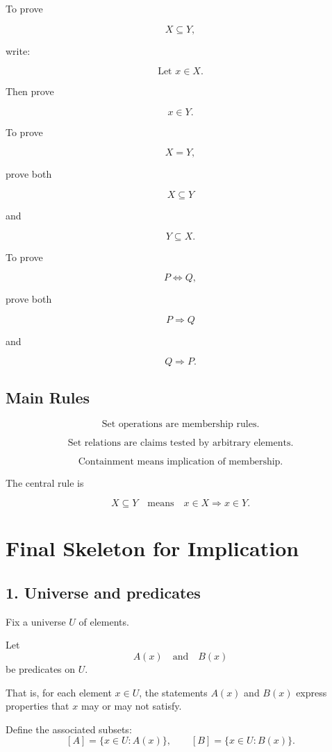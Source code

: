 \documentclass{article}
\begin{document}
	To prove
	
	\[
	X \subseteq Y,
	\]
	
	write:
	
	\[
	\text{Let } x \in X.
	\]
	
	Then prove
	
	\[
	x \in Y.
	\]
	
	To prove
	
	\[
	X = Y,
	\]
	
	prove both
	
	\[
	X \subseteq Y
	\]
	
	and
	
	\[
	Y \subseteq X.
	\]
	
	To prove
	
	\[
	P \iff Q,
	\]
	
	prove both
	
	\[
	P \Rightarrow Q
	\]
	
	and
	
	\[
	Q \Rightarrow P.
	\]
	
	\subsection{Main Rules}
	
	\[
	\text{Set operations are membership rules.}
	\]
	
	\[
	\text{Set relations are claims tested by arbitrary elements.}
	\]
	
	\[
	\text{Containment means implication of membership.}
	\]
	
	The central rule is
	
	\[
	X \subseteq Y
	\quad \text{means} \quad
	x \in X \Rightarrow x \in Y.
	\]
	\section*{Final Skeleton for Implication}
	
	\subsection*{1. Universe and predicates}
	Fix a universe \(U\) of elements.
	
	Let
	\[
	A(x) \quad \text{and} \quad B(x)
	\]
	be predicates on \(U\).
	
	That is, for each element \(x \in U\), the statements \(A(x)\) and \(B(x)\) express properties that \(x\) may or may not satisfy.
	
	\bigskip
	
	Define the associated subsets:
	\[
	[A] = \{x \in U : A(x)\},
	\qquad
	[B] = \{x \in U : B(x)\}.
	\]
	
\end{document}
